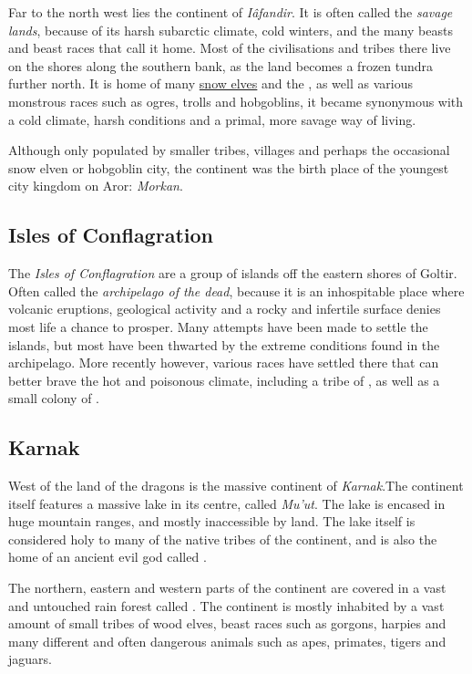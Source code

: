 Far to the north west lies the continent of \emph{Iâfandir}. It is often
called the \emph{savage lands}, because of its harsh subarctic climate, cold
winters, and the many beasts and beast races that call it home. Most of the
civilisations and tribes there live on the shores along the southern bank, as
the land becomes a frozen tundra further north. It is home of many
\hyperref[sec:Snow Elves]{snow elves} and the , as well as
various monstrous races such as ogres, trolls and hobgoblins, it became
synonymous with a cold climate, harsh conditions and a primal, more savage way
of living.

Although only populated by smaller tribes, villages and perhaps the occasional
snow elven or hobgoblin city, the continent was the birth place of the youngest
city kingdom on Aror: \emph{Morkan}.

\subsection{Isles of Conflagration}
\label{sec:Isles of Conflagration}

The \emph{Isles of Conflagration} are a group of islands off the eastern
shores of Goltir. Often called the \emph{archipelago of the dead}, because it
is an inhospitable place where volcanic eruptions, geological activity and a
rocky and infertile surface denies most life a chance to prosper. Many attempts
have been made to settle the islands, but most have been thwarted by the extreme
conditions found in the archipelago. More recently however, various races have
settled there that can better brave the hot and poisonous climate, including a
tribe of , as well as a small colony of
.

\subsection{Karnak}
\label{sec:Karnak}

West of the land of the dragons is the massive continent of \emph{Karnak}.The
continent itself features a massive lake in its centre, called \emph{Mu'ut}.
The lake is encased in huge mountain ranges, and mostly inaccessible by
land. The lake itself is considered holy to many of the native tribes of the
continent, and is also the home of an ancient evil god called
.

The northern, eastern and western parts of the continent are covered in a vast
and untouched rain forest called . The continent is
mostly inhabited by a vast amount of small tribes of wood elves, beast races
such as gorgons, harpies and many different and often dangerous animals such
as apes, primates, tigers and jaguars.

